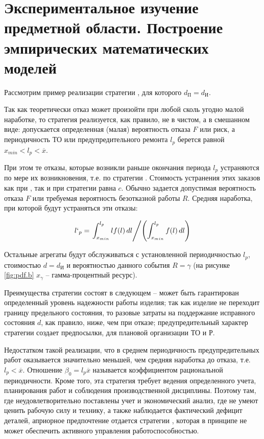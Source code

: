\documentclass[../nirs.tex]{subfiles}
\begin{document}
\section{Экспериментальное изучение предметной области. Построение эмпирических
математических моделей}

Рассмотрим пример реализации стратегии , для которого $d_\text{П} =
d_\text{И}$.

Так как теоретически отказ может произойти при любой сколь угодно малой
наработке, то стратегия  реализуется, как правило, не в чистом, а в
смешанном виде: допускается определенная (малая) вероятность отказа $F$ или
риск, а периодичность ТО или предупредительного ремонта $l_p$ берется равной
$x_{min} < l_p < \overline{x}$.

При этом те отказы, которые возникли раньше окончания периода $l_p$ устраняются
по мере их возникновения, т.е. по стратегии . Стоимость устранения этих
заказов как при , так и при  стратегии равна $c$. Обычно задается
допустимая вероятность отказа $F$ или требуемая вероятность безотказной работы
$R$. Средняя наработка, при которой будут устраняться эти отказы:

\begin{equation*}
    l`_p =
    \left.
    \int_{x_{min}}^{l_p} lf(l)\,dl
    \middle/
    \left( \int_{x_{min}}^{l_p} f(l)\,dl \right)
    \right.
\end{equation*}

Остальные агрегаты будут обслуживаться с установленной периодичностью $l_p$,
стоимостью $d = d_\text{И}$ и вероятностью данного события $R = \gamma$ (на
рисунке \ref{fig:pdf.b} $x_\gamma$ -- гамма-процентный ресурс).

Преимущества стратегии  состоят в следующем -- может быть гарантирован
определенный уровень надежности работы изделия; так как изделие не переходит
границу предельного состояния, то разовые затраты на поддержание исправного
состояния $d$, как правило, ниже, чем при отказе; предупредительный характер
стратегии  создает предпосылки, для плановой организации ТО и Р.

Недостатком такой реализации, что в среднем периодичность предупредительных
работ оказывается значительно меньшей, чем средняя наработка до отказа, т.е.
$l_p < \overline{x}$. Отношение $\beta_0 = l_p \overline{x}$ называется
коэффициентом рациональной периодичности. Кроме того, эта стратегия требует
ведения определенного учета, планирования работ и соблюдения производственной
дисциплины. Поэтому там, где неудовлетворительно поставлены учет и экономический
анализ, где не умеют ценить рабочую силу и технику, а также наблюдается
фактический дефицит деталей, априорное предпочтение отдается стратегии ,
которая в принципе не может обеспечить активного управления работоспособностью.
\end{document}
